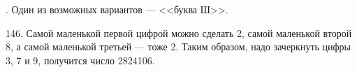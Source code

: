 \documentclass[12pt]{article}
\begin{document}
\begin{center}
\begin{figure}[ht!]
\end{figure}
\end{center}\newpage{}. Один из возможных вариантов --- <<буква Ш>>.
\begin{center}
\begin{figure}[ht!]
\end{figure}
\end{center}
146. Самой маленькой первой цифрой можно сделать 2, самой маленькой второй 8, а самой маленькой третьей --- тоже 2. Таким образом, надо зачеркнуть цифры 3, 7 и 9, получится число 2824106.\\
\end{document}
